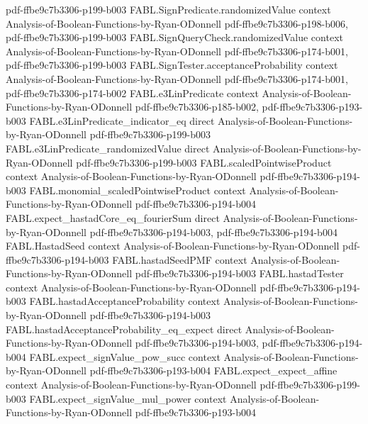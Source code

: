 \begin{theorem}
  {pdf-ffbe9c7b3306-p199-b003}
\proofstep
  {FABL.SignPredicate.randomizedValue}
  {context}
  {Analysis-of-Boolean-Functions-by-Ryan-ODonnell}
  {pdf-ffbe9c7b3306-p198-b006,
    pdf-ffbe9c7b3306-p199-b003}
\proofstep
  {FABL.SignQueryCheck.randomizedValue}
  {context}
  {Analysis-of-Boolean-Functions-by-Ryan-ODonnell}
  {pdf-ffbe9c7b3306-p174-b001,
    pdf-ffbe9c7b3306-p199-b003}
\proofstep
  {FABL.SignTester.acceptanceProbability}
  {context}
  {Analysis-of-Boolean-Functions-by-Ryan-ODonnell}
  {pdf-ffbe9c7b3306-p174-b001,
    pdf-ffbe9c7b3306-p174-b002}
\proofstep
  {FABL.e3LinPredicate}
  {context}
  {Analysis-of-Boolean-Functions-by-Ryan-ODonnell}
  {pdf-ffbe9c7b3306-p185-b002,
    pdf-ffbe9c7b3306-p193-b003}
\proofstep
  {FABL.e3LinPredicate_indicator_eq}
  {direct}
  {Analysis-of-Boolean-Functions-by-Ryan-ODonnell}
  {pdf-ffbe9c7b3306-p199-b003}
\proofstep
  {FABL.e3LinPredicate_randomizedValue}
  {direct}
  {Analysis-of-Boolean-Functions-by-Ryan-ODonnell}
  {pdf-ffbe9c7b3306-p199-b003}
\proofstep
  {FABL.scaledPointwiseProduct}
  {context}
  {Analysis-of-Boolean-Functions-by-Ryan-ODonnell}
  {pdf-ffbe9c7b3306-p194-b003}
\proofstep
  {FABL.monomial_scaledPointwiseProduct}
  {context}
  {Analysis-of-Boolean-Functions-by-Ryan-ODonnell}
  {pdf-ffbe9c7b3306-p194-b004}
\proofstep
  {FABL.expect_hastadCore_eq_fourierSum}
  {direct}
  {Analysis-of-Boolean-Functions-by-Ryan-ODonnell}
  {pdf-ffbe9c7b3306-p194-b003,
    pdf-ffbe9c7b3306-p194-b004}
\proofstep
  {FABL.HastadSeed}
  {context}
  {Analysis-of-Boolean-Functions-by-Ryan-ODonnell}
  {pdf-ffbe9c7b3306-p194-b003}
\proofstep
  {FABL.hastadSeedPMF}
  {context}
  {Analysis-of-Boolean-Functions-by-Ryan-ODonnell}
  {pdf-ffbe9c7b3306-p194-b003}
\proofstep
  {FABL.hastadTester}
  {context}
  {Analysis-of-Boolean-Functions-by-Ryan-ODonnell}
  {pdf-ffbe9c7b3306-p194-b003}
\proofstep
  {FABL.hastadAcceptanceProbability}
  {context}
  {Analysis-of-Boolean-Functions-by-Ryan-ODonnell}
  {pdf-ffbe9c7b3306-p194-b003}
\proofstep
  {FABL.hastadAcceptanceProbability_eq_expect}
  {direct}
  {Analysis-of-Boolean-Functions-by-Ryan-ODonnell}
  {pdf-ffbe9c7b3306-p194-b003,
    pdf-ffbe9c7b3306-p194-b004}
\proofstep
  {FABL.expect_signValue_pow_succ}
  {context}
  {Analysis-of-Boolean-Functions-by-Ryan-ODonnell}
  {pdf-ffbe9c7b3306-p193-b004}
\proofstep
  {FABL.expect_expect_affine}
  {context}
  {Analysis-of-Boolean-Functions-by-Ryan-ODonnell}
  {pdf-ffbe9c7b3306-p199-b003}
\proofstep
  {FABL.expect_signValue_mul_power}
  {context}
  {Analysis-of-Boolean-Functions-by-Ryan-ODonnell}
  {pdf-ffbe9c7b3306-p193-b004}
\proofstep

\end{theorem}

